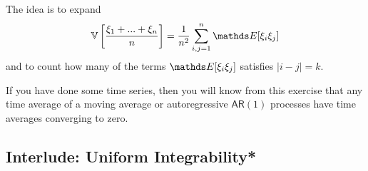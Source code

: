 \begin{hint}
The idea is to expand 
\begin{equation}
\V\sqbracket{\frac{\xi_1 + ... + \xi_n}{n}} = \frac{1}{n^2} \sum_{i,j=1}^n \E[\xi_i \xi_j]
\end{equation}
and to count how many of the terms $\E[\xi_i \xi_j]$ satisfies $|i-j|=k$. 
\end{hint}

If you have done some time series, then you will know from this exercise that any time average of a moving average or autoregressive $\mathsf{AR}(1)$ processes have time averages converging to zero. 

\subsection{Interlude: Uniform Integrability*}
